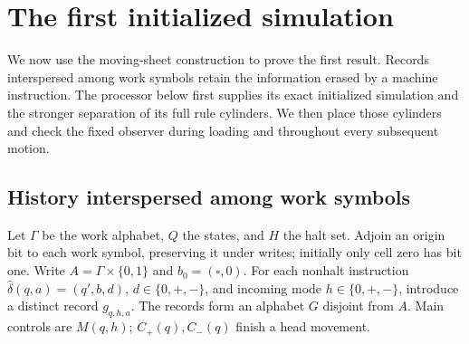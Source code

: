 \section{The first initialized simulation}\label{sec:sa-histories}
We now use the moving-sheet construction to prove the first result.
Records interspersed among work symbols retain the information erased by
a machine instruction. The processor below first supplies its exact
initialized simulation and the stronger separation of its full rule
cylinders. We then place those cylinders and check the fixed observer
during loading and throughout every subsequent motion.

\subsection{History interspersed among work symbols}\label{subsec:sa-interleaved}
Let $\Gamma$ be the work alphabet, $Q$ the states, and $H$ the halt set.
Adjoin an origin bit to each work symbol, preserving it under writes;
initially only cell zero has bit one.  Write $A=\Gamma\times\{0,1\}$ and
$b_0=(\square,0)$.  For each nonhalt instruction
$\widehat\delta(q,a)=(q',b,d)$, $d\in\{0,+,-\}$, and incoming mode
$h\in\{0,+,-\}$, introduce a distinct record $g_{q,h,a}$.  The records
form an alphabet $G$ disjoint from $A$.  Main controls are $M(q,h)$;
$C_+(q),C_-(q)$ finish a head movement.

